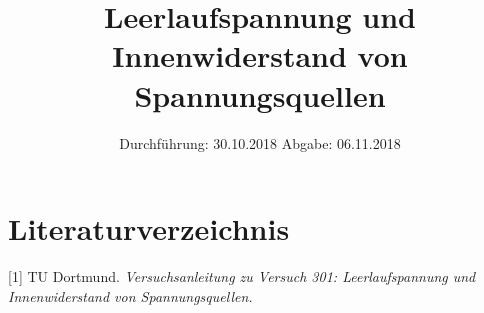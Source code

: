 

\subject{Versuch Nr. 301}
\title{Leerlaufspannung und Innenwiderstand von Spannungsquellen}
\date{%
  Durchführung: 30.10.2018
  \hspace{3em}
  Abgabe: 06.11.2018
}



\maketitle
\thispagestyle{empty}
\tableofcontents
\newpage






\section{Literaturverzeichnis}

[1] TU Dortmund. \textit{Versuchsanleitung zu Versuch 301: 
Leerlaufspannung und Innenwiderstand von Spannungsquellen.}

\printbibliography{}



